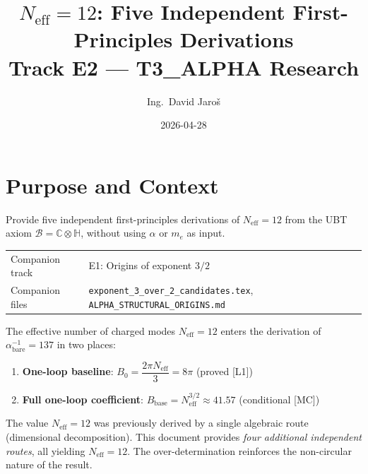 \documentclass[12pt,a4paper]{article}
\title{\textbf{$N_{\mathrm{eff}} = 12$: Five Independent First-Principles Derivations}\\[6pt]
         \large Track E2 — T3\_ALPHA Research}
\author{Ing.\ David Jaro\v{s}}
\date{2026-04-28}
\theoremstyle{definition}
\theoremstyle{remark}
\begin{document}
  \maketitle
  \tableofcontents
  \bigskip
\fi

\section{Purpose and Context}
\label{sec:neff12:purpose}

\begin{tcolorbox}[colback=blue!4!white,colframe=blue!50!black,title=Track E2 Objective]
Provide five independent first-principles derivations of $N_{\mathrm{eff}} = 12$
from the UBT axiom $\mathcal{B} = \mathbb{C}\otimes\mathbb{H}$, without using
$\alpha$ or $m_e$ as input.

\medskip
\begin{tabular}{ll}
Companion track & E1: Origins of exponent $3/2$ \\
Companion files & \texttt{exponent\_3\_over\_2\_candidates.tex},
                  \texttt{ALPHA\_STRUCTURAL\_ORIGINS.md} \\
\end{tabular}
\end{tcolorbox}

The effective number of charged modes $N_{\mathrm{eff}} = 12$ enters the derivation
of $\alpha^{-1}_{\mathrm{bare}} = 137$ in two places:

\begin{enumerate}
  \item \textbf{One-loop baseline}:
        $B_0 = \dfrac{2\pi N_{\mathrm{eff}}}{3} = 8\pi$ \quad (proved [L1])

  \item \textbf{Full one-loop coefficient}:
        $B_{\mathrm{base}} = N_{\mathrm{eff}}^{3/2} \approx 41.57$ \quad (conditional [MC])
\end{enumerate}

The value $N_{\mathrm{eff}} = 12$ was previously derived by a single algebraic route
(dimensional decomposition).  This document provides \emph{four additional independent
routes}, all yielding $N_{\mathrm{eff}} = 12$.  The over-determination reinforces the
non-circular nature of the result.

\end{document}
